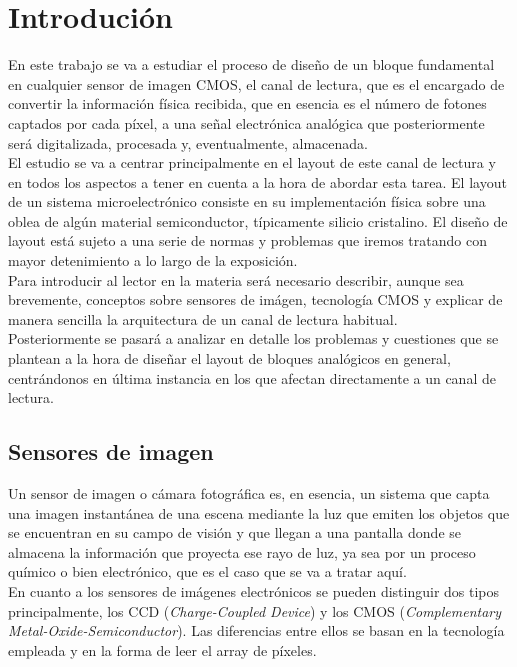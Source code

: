 \chapter{Introdución}\label{cap:intro}

En este trabajo se va a estudiar el proceso de diseño de un bloque fundamental
en cualquier sensor de imagen CMOS, el canal de lectura, que es el encargado
de convertir la información física recibida, que en esencia es el número de fotones
captados por cada píxel, a una señal electrónica analógica que posteriormente será digitalizada,
procesada y, eventualmente, almacenada.\\

El estudio se va a centrar principalmente en el layout de este canal de
lectura y en todos los aspectos a tener en cuenta a la hora de abordar esta tarea.
El layout de un sistema microelectrónico consiste en su implementación física
sobre una oblea de algún material semiconductor, típicamente silicio cristalino. El
diseño de layout está sujeto a una serie de normas y problemas que iremos tratando
con mayor detenimiento a lo largo de la exposición.\\

Para introducir al lector en la materia será necesario describir, aunque sea
brevemente, conceptos sobre sensores de imágen, tecnología CMOS y explicar de manera
sencilla la arquitectura de un canal de lectura habitual.\\

Posteriormente se pasará a analizar en detalle los problemas y cuestiones que se
plantean a la hora de diseñar el layout de bloques analógicos en general,
centrándonos en última instancia en los que afectan directamente a un canal de lectura.\\

\section{Sensores de imagen}\label{cap:image_sensors}

Un sensor de imagen o cámara fotográfica es, en esencia, un sistema que capta
una imagen instantánea de una escena mediante la luz que emiten los objetos que
se encuentran en su campo de visión y que llegan a una pantalla donde se almacena
la información que proyecta ese rayo de luz, ya sea por un proceso químico
o bien electrónico, que es el caso que se va a tratar aquí.\\

En cuanto a los sensores de imágenes electrónicos se pueden distinguir dos tipos
principalmente, los CCD (\textit{Charge-Coupled Device}) y los CMOS
(\textit{Complementary Metal-Oxide-Semiconductor}). Las diferencias entre ellos
se basan en la tecnología empleada y en la forma de leer el array de píxeles.
\cite{Moini2010}\cite{Nakamura2005}\\


